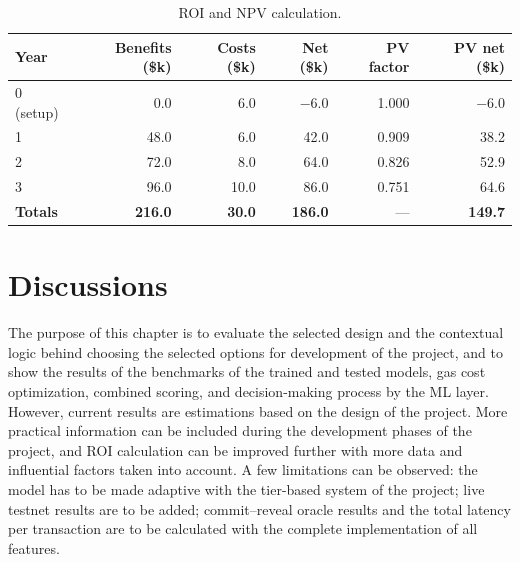 \begin{table}[H]
\centering
\caption[ROI and NPV calculation]{ROI and NPV calculation.}
\label{tab:ch5-roi-calculation}
\small
\begin{tabular}{@{}lrrrrr@{}}
\toprule
\tableheadcolor
\textbf{Year} & \textbf{Benefits (\$k)} & \textbf{Costs (\$k)} & \textbf{Net (\$k)} & \textbf{PV factor} & \textbf{PV net (\$k)} \\
\midrule
0 (setup) & 0.0 & 6.0 & $-$6.0 & 1.000 & $-$6.0 \\
1 & 48.0 & 6.0 & 42.0 & 0.909 & 38.2 \\
2 & 72.0 & 8.0 & 64.0 & 0.826 & 52.9 \\
3 & 96.0 & 10.0 & 86.0 & 0.751 & 64.6 \\
\midrule
\textbf{Totals} & \textbf{216.0} & \textbf{30.0} & \textbf{186.0} & --- & \textbf{149.7} \\
\bottomrule
\end{tabular}
\end{table}

\section{Discussions}
\label{sec:discussion}
\label{sec:research-limitations}

The purpose of this chapter is to evaluate the selected design and the contextual logic behind choosing the selected options for development of the project, and to show the results of the benchmarks of the trained and tested models, gas cost optimization, combined scoring, and decision-making process by the ML layer. However, current results are estimations based on the design of the project. More practical information can be included during the development phases of the project, and ROI calculation can be improved further with more data and influential factors taken into account. A few limitations can be observed: the model has to be made adaptive with the tier-based system of the project; live testnet results are to be added; commit--reveal oracle results and the total latency per transaction are to be calculated with the complete implementation of all features.

